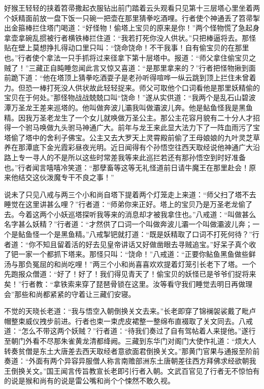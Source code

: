 \documentclass[12pt,UTF8]{ctexbook}
\begin{document}
好猴王轻轻的挟着笤帚撒起衣服钻出前门踏着云头观看只见第十三层塔心里坐着两个妖精面前放一盘下饭一只碗一把壶在那里猜拳吃酒哩。行者使个神通丢了笤帚掣出金箍棒拦住塔门喝道：“好怪物！偷塔上宝贝的原来是你！”两个怪物慌了急起身拿壶拿碗乱掼被行者横铁棒拦住道：“我若打死你没人供状。”只把棒逼将去。那怪贴在壁上莫想挣扎得动口里只叫：“饶命饶命！不干我事！自有偷宝贝的在那里也。”行者使个拿法一只手抓将过来径拿下第十层塔中。报道：“师父拿住偷宝贝之贼了！”三藏正自盹睡忽闻此言又惊又喜道：“是那里拿来的？”行者把怪物揪到面前跪下道：“他在塔顶上猜拳吃酒耍子是老孙听得喧哗一纵云跳到顶上拦住未曾着力。但恐一棒打死没人供状故此轻轻捉来。师父可取他个口词看他是那里妖精偷的宝贝在于何处。”那怪物战战兢兢口叫“饶命！”遂从实供道：“我两个是乱石山碧波潭万圣龙王差来巡塔的。他叫做奔波儿灞我叫做灞波儿奔。他是鲇鱼怪我是黑鱼精。因我万圣老龙生了一个女儿就唤做万圣公主。那公主花容月貌有二十分人才招得一个驸马唤做九头驸马神通广大。前年与龙王来此显大法力下了一阵血雨污了宝塔偷了塔中的舍利子佛宝。公主又去大罗天上灵霄殿前偷了王母娘娘的九叶灵芝草养在那潭底下金光霞彩昼夜光明。近日闻得有个孙悟空往西天取经说他神通广大沿路上专一寻人的不是所以这些时常差我等来此巡拦若还有那孙悟空到时好准备也。”行者闻言嘻嘻冷笑道：“那孽畜等这等无礼怪道前日请牛魔王在那里赴会！原来他结交这伙泼魔专干不良之事！”

说未了只见八戒与两三个小和尚自塔下提着两个灯笼走上来道：“师父扫了塔不去睡觉在这里讲甚么哩？”行者道：“师弟你来正好。塔上的宝贝乃是万圣老龙偷了去。今着这两个小妖巡塔探听我等来的消息却才被我拿住也。”八戒道：“叫做甚么名字甚么妖精？”行者道：“才然供了口词一个叫做奔波儿灞一个叫做灞波儿奔；一个是鲇鱼怪一个是黑鱼精。”八戒掣钯就打道：“既是妖精取了口词不打死何待？”行者道：“你不知且留着活的好去见皇帝讲话又好做凿眼去寻贼追宝。”好呆子真个收了钯一家一个都抓下塔来。那怪只叫：“饶命！”八戒道：“正要你鲇鱼黑鱼做些鲜汤与那负冤屈的和尚吃哩！”两三个小和尚喜喜欢欢提着灯笼引长老下了塔。一个先跑报众僧道：“好了！好了！我们得见青天了！偷宝贝的妖怪已是爷爷们捉将来矣！”行者教：“拿铁索来穿了琵琶骨锁在这里。汝等看守我们睡觉去明日再做理会”那些和尚都紧紧的守着让三藏们安寝。

不觉的天晓长老道：“我与悟空入朝倒换关文去来。”长老即穿了锦襕袈裟戴了毗卢帽整束威仪拽步前进。行者也束一束虎皮裙整一整绵布直裰取了关文同去。八戒道：“怎么不带这两个妖贼？”行者道：“待我们奏过了自有驾帖着人来提他。”遂行至朝门外看不尽那朱雀黄龙清都绛阙。三藏到东华门对阁门大使作礼道：“烦大人转奏贫僧是东土大唐差去西天取经者意欲面君倒换关文。”那黄门官果与通报至阶前奏道：“外面有两个异容异服僧人称言南赡部洲东土唐朝差往西方拜佛求经欲朝我王倒换关文。”国王闻言传旨教宣长老即引行者入朝。文武百官见了行者无不惊怕有的说是猴和尚有的说是雷公嘴和尚个个悚然不敢久视。
\end{document}
